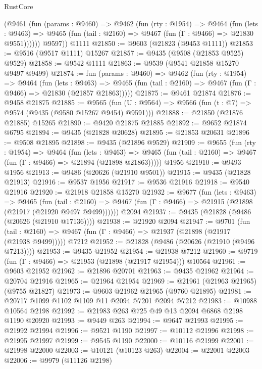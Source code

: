 \begin{lexlean}{RustCore}
\begin{coremodule}
        (@9461
          (fun (params : @9460) =>
          @9462
            (fun (rty : @1954) =>
            @9464
              (fun (lets : @9463) =>
              @9465 (fun (tail : @2160) => @9467 (fun (Γ : @9466) => @21830 @9551))))))
        @9597))
    @1111
@21850 := @9603 (@21823 (@9453 @1111))
@21853 := @9516 (@9517 @1111) @15267
@21857 := @9435 (@9508 (@21853 @9525) @9529)
@21858 := @9542 @1111
@21863 := @9539 (@9541 @21858 @15270 @9497 @9499)
@21874 := fun (params : @9460) =>
  @9462
    (fun (rty : @1954) =>
    @9464
      (fun (lets : @9463) =>
      @9465 (fun (tail : @2160) => @9467 (fun (Γ : @9466) => @21830 (@21857 @21863)))))
@21875 := @9461 @21874
@21876 := @9458 @21875
@21885 := @9565
    (fun (U : @9564) => @9566 (fun (t : @7) => @9574 (@9435 (@9580 @15267 @9454) @9591)))
@21888 := @21850 (@21876 @21885) @15265
@21890 := @9420 @21875 @21885
@21892 := @9652 @21874 @6795
@21894 := @9435 (@21828 @20628)
@21895 := @21853 @20631
@21896 := @9508 @21895
@21898 := @9435 (@21896 @9529)
@21909 := @9655
    (fun (rty : @1954) =>
    @9464
      (fun (lets : @9463) =>
      @9465 (fun (tail : @2160) => @9467 (fun (Γ : @9466) => @21894 (@21898 @21863)))))
    @1956
@21910 := @9493 @1956
@21913 := @9486 (@20626 (@21910 @9501))
@21915 := @9435 (@21828 @21913)
@21916 := @9537 @1956
@21917 := @9536 @21916
@21918 := @9540 @21916
@21920 := @21918 @21858 @15270
@21932 := @9677
    (fun (lets : @9463) =>
    @9465
      (fun (tail : @2160) =>
      @9467 (fun (Γ : @9466) => @21915 (@21898 (@21917 (@21920 @9497 @9499))))))
    @2094
@21937 := @9435 (@21828 (@9486 (@20626 (@21910 @17136))))
@21938 := @21920 @2094
@21947 := @9701
    (fun (tail : @2160) => @9467 (fun (Γ : @9466) => @21937 (@21898 (@21917 (@21938 @9499)))))
    @7212
@21952 := @21828 (@9486 (@20626 (@21910 (@9496 @7213))))
@21953 := @9435 @21952
@21954 := @21938 @7212
@21960 := @9719 (fun (Γ : @9466) => @21953 (@21898 (@21917 @21954))) @10564
@21961 := @9603 @21952
@21962 := @21896 @20701
@21963 := @9435 @21962
@21964 := @20704 @21916
@21965 := @21964 @21954
@21969 := @21961 (@21963 @21965) (@9755 @21827)
@21973 := @9603 @21962 @21965 (@9760 @21895)
@21981 := @20717 @1099 @1102 @1109 @11 @2094 @7201 @2094 @7212
@21983 := @10988 @10564 @2198
@21992 := @21983 @263 @725 @49 @13 @2094 @6868 @2198 @1190 @20920
@21993 := @9449 @263
@21994 := @9647 @21993
@21995 := @21992 @21994
@21996 := @9521 @1190
@21997 := @10112 @21996
@21998 := @21995 @21997
@21999 := @9545 @1190
@22000 := @10116 @21999
@22001 := @21998 @22000
@22003 := @10121 (@10123 @263)
@22004 := @22001 @22003
@22006 := @9979 (@11126 @2198)

\end{coremodule}
\end{lexlean}
